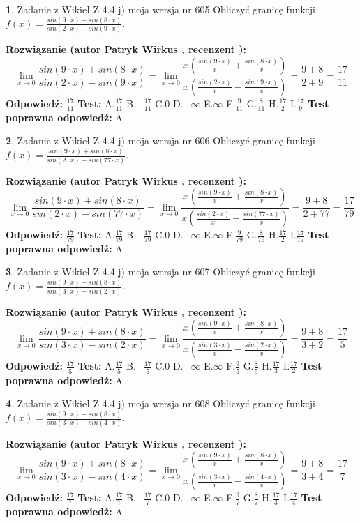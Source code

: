 \documentclass[12pt, a4paper]{article}
\theoremstyle{definition} %
\newtheorem{zad}{}
\newcommand{\zadStart}[1]{\begin{zad}#1\newline}
\newcommand{\zadStop}{\end{zad}}
\newcommand{\rozwStart}[2]{\noindent \textbf{Rozwiązanie (autor #1 , recenzent #2): }\newline}
\newcommand{\rozwStop}{\newline}
\newcommand{\odpStart}{\noindent \textbf{Odpowiedź:}\newline}
\newcommand{\odpStop}{\newline}
\newcommand{\testStart}{\noindent \textbf{Test:}\newline}
\newcommand{\testStop}{\newline}
\newcommand{\kluczStart}{\noindent \textbf{Test poprawna odpowiedź:}\newline}
\newcommand{\kluczStop}{\newline}
\begin{document}
\zadStart{Zadanie z Wikieł Z 4.4 j) moja wersja nr 605}
Obliczyć granicę funkcji $f(x)=\frac{sin(9\cdot x) +sin(8\cdot x)}{sin(2\cdot x) -sin(9\cdot x)}$.
\zadStop
\rozwStart{Patryk Wirkus}{}
$$\lim\limits_{x\to 0}\frac{sin(9\cdot x) +sin(8\cdot x)}{sin(2\cdot x) -sin(9\cdot x)}=\lim\limits_{x\to 0}\frac{x(\frac{sin(9\cdot x)}{x}+\frac{sin(8\cdot x)}{x})}{x(\frac{sin(2\cdot x)}{x}-\frac{sin(9\cdot x)}{x})}=\frac{9+8}{2+9} = \frac{17}{11}$$
\rozwStop
\odpStart
$\frac{17}{11}$
\odpStop
\testStart
A.$\frac{17}{11}$
B.$-\frac{17}{11}$
C.$0$
D.$-\infty$
E.$\infty$
F.$\frac{9}{11}$
G.$\frac{8}{11}$
H.$\frac{17}{2}$
I.$\frac{17}{9}$
\testStop
\kluczStart
A
\kluczStop



\zadStart{Zadanie z Wikieł Z 4.4 j) moja wersja nr 606}
Obliczyć granicę funkcji $f(x)=\frac{sin(9\cdot x) +sin(8\cdot x)}{sin(2\cdot x) -sin(77\cdot x)}$.
\zadStop
\rozwStart{Patryk Wirkus}{}
$$\lim\limits_{x\to 0}\frac{sin(9\cdot x) +sin(8\cdot x)}{sin(2\cdot x) -sin(77\cdot x)}=\lim\limits_{x\to 0}\frac{x(\frac{sin(9\cdot x)}{x}+\frac{sin(8\cdot x)}{x})}{x(\frac{sin(2\cdot x)}{x}-\frac{sin(77\cdot x)}{x})}=\frac{9+8}{2+77} = \frac{17}{79}$$
\rozwStop
\odpStart
$\frac{17}{79}$
\odpStop
\testStart
A.$\frac{17}{79}$
B.$-\frac{17}{79}$
C.$0$
D.$-\infty$
E.$\infty$
F.$\frac{9}{79}$
G.$\frac{8}{79}$
H.$\frac{17}{2}$
I.$\frac{17}{77}$
\testStop
\kluczStart
A
\kluczStop



\zadStart{Zadanie z Wikieł Z 4.4 j) moja wersja nr 607}
Obliczyć granicę funkcji $f(x)=\frac{sin(9\cdot x) +sin(8\cdot x)}{sin(3\cdot x) -sin(2\cdot x)}$.
\zadStop
\rozwStart{Patryk Wirkus}{}
$$\lim\limits_{x\to 0}\frac{sin(9\cdot x) +sin(8\cdot x)}{sin(3\cdot x) -sin(2\cdot x)}=\lim\limits_{x\to 0}\frac{x(\frac{sin(9\cdot x)}{x}+\frac{sin(8\cdot x)}{x})}{x(\frac{sin(3\cdot x)}{x}-\frac{sin(2\cdot x)}{x})}=\frac{9+8}{3+2} = \frac{17}{5}$$
\rozwStop
\odpStart
$\frac{17}{5}$
\odpStop
\testStart
A.$\frac{17}{5}$
B.$-\frac{17}{5}$
C.$0$
D.$-\infty$
E.$\infty$
F.$\frac{9}{5}$
G.$\frac{8}{5}$
H.$\frac{17}{3}$
I.$\frac{17}{2}$
\testStop
\kluczStart
A
\kluczStop



\zadStart{Zadanie z Wikieł Z 4.4 j) moja wersja nr 608}
Obliczyć granicę funkcji $f(x)=\frac{sin(9\cdot x) +sin(8\cdot x)}{sin(3\cdot x) -sin(4\cdot x)}$.
\zadStop
\rozwStart{Patryk Wirkus}{}
$$\lim\limits_{x\to 0}\frac{sin(9\cdot x) +sin(8\cdot x)}{sin(3\cdot x) -sin(4\cdot x)}=\lim\limits_{x\to 0}\frac{x(\frac{sin(9\cdot x)}{x}+\frac{sin(8\cdot x)}{x})}{x(\frac{sin(3\cdot x)}{x}-\frac{sin(4\cdot x)}{x})}=\frac{9+8}{3+4} = \frac{17}{7}$$
\rozwStop
\odpStart
$\frac{17}{7}$
\odpStop
\testStart
A.$\frac{17}{7}$
B.$-\frac{17}{7}$
C.$0$
D.$-\infty$
E.$\infty$
F.$\frac{9}{7}$
G.$\frac{8}{7}$
H.$\frac{17}{3}$
I.$\frac{17}{4}$
\testStop
\kluczStart
A
\kluczStop
\end{document}
